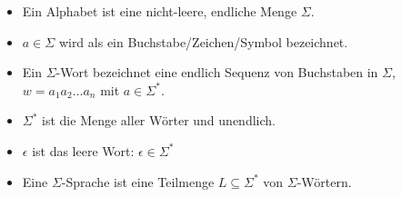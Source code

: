 \documentclass[12pt]{scrreprt}
\begin{document}
            \begin{itemize}
                \item Ein Alphabet ist eine nicht-leere, endliche Menge $ \Sigma $.
                \item $ a \in \Sigma $ wird als ein Buchstabe/Zeichen/Symbol bezeichnet.
                \item Ein $ \Sigma $-Wort bezeichnet eine endlich Sequenz von Buchstaben in $ \Sigma $, $ w = a _ 1 a _ 2 \dots a _ n $ mit $ a \in \Sigma ^ * $.
                \item $ \Sigma ^ * $ ist die Menge aller Wörter und unendlich.
                \item $ \epsilon $ ist das leere Wort: $ \epsilon \in \Sigma ^ * $
                \item Eine $ \Sigma $-Sprache ist eine Teilmenge $ L \subseteq \Sigma ^ * $ von $ \Sigma $-Wörtern.
            \end{itemize}
\end{document}
